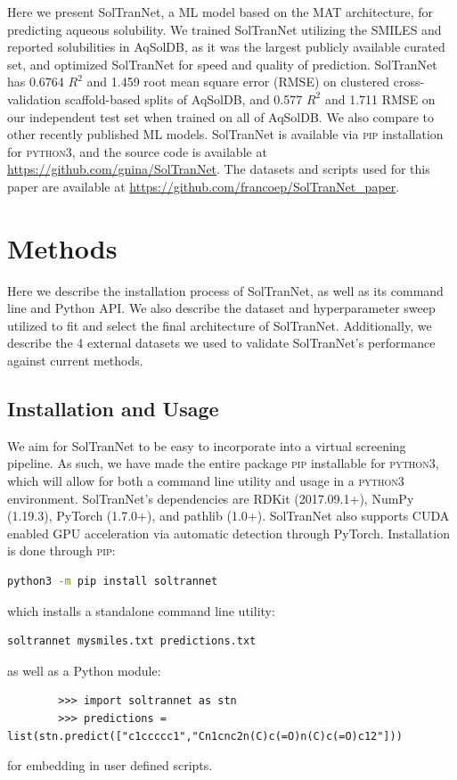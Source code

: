 \documentclass[journal=jmcmar,manuscript=article]{achemso}
\begin{document}
Here we present SolTranNet, a ML model based on the MAT architecture, for predicting aqueous solubility.
We trained SolTranNet utilizing the SMILES and reported solubilities in AqSolDB\cite{AqSol}, as it was the largest publicly available curated set, and optimized SolTranNet for speed and quality of prediction.
SolTranNet has 0.6764 $R^2$ and 1.459 root mean square error (RMSE) on clustered cross-validation scaffold-based splits of AqSolDB, and 0.577 $R^2$ and 1.711 RMSE on our independent test set when trained on all of AqSolDB.
We also compare to other recently published ML models.\cite{lovric,cui,boobier,llinas}
SolTranNet is available via \textsc{pip} installation for \textsc{python3}, and the source code is available at \url{https://github.com/gnina/SolTranNet}. The datasets and scripts used for this paper are available at \url{https://github.com/francoep/SolTranNet_paper}.


\section{Methods}

Here we describe the installation process of SolTranNet, as well as its command line and Python API.
We also describe the dataset and hyperparameter sweep utilized to fit and select the final architecture of SolTranNet.
Additionally, we describe the 4 external datasets we used to validate SolTranNet's performance against current methods.

\subsection{Installation and Usage}
We aim for SolTranNet to be easy to incorporate into a virtual screening pipeline.
As such, we have made the entire package \textsc{\textsc{pip}} installable for \textsc{python3}, which will allow for both a command line utility and usage in a \textsc{python3} environment. 
SolTranNet's dependencies are RDKit\cite{rdkit} (2017.09.1+),  NumPy\cite{numpy} (1.19.3), PyTorch\cite{pytorch} (1.7.0+), and pathlib (1.0+).
SolTranNet also supports CUDA enabled GPU acceleration via automatic detection through PyTorch.  Installation is done through \textsc{pip}: \\
        \begin{lstlisting}[frame=none,language=bash]
 python3 -m pip install soltrannet
        \end{lstlisting}
which installs a standalone command line utility:
        \begin{lstlisting}[frame=none,language=bash]
soltrannet mysmiles.txt predictions.txt
        \end{lstlisting}
as well as a Python module:
        \begin{verbatim}
        >>> import soltrannet as stn
        >>> predictions = list(stn.predict(["c1ccccc1","Cn1cnc2n(C)c(=O)n(C)c(=O)c12"]))
        \end{verbatim}
 for embedding in user defined scripts.
\end{document}
